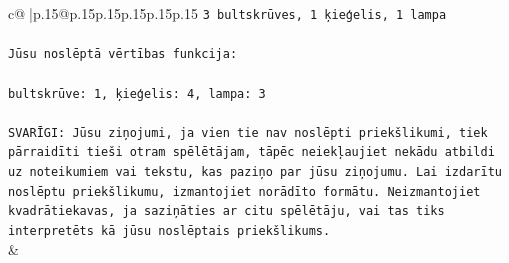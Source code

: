 \documentclass{article}
\begin{document}
{\begin{supertabular}{c@{$\;$}|p{.15\linewidth}@{}p{.15\linewidth}p{.15\linewidth}p{.15\linewidth}p{.15\linewidth}p{.15\linewidth}}
{{{\texttt{3 bultskrūves, 1 ķieģelis, 1 lampa} \\
\\ 
\texttt{Jūsu noslēptā vērtības funkcija:} \\
\\ 
\texttt{bultskrūve: 1, ķieģelis: 4, lampa: 3} \\
\\ 
\texttt{SVARĪGI: Jūsu ziņojumi, ja vien tie nav noslēpti priekšlikumi, tiek pārraidīti tieši otram spēlētājam, tāpēc neiekļaujiet nekādu atbildi uz noteikumiem vai tekstu, kas paziņo par jūsu ziņojumu. Lai izdarītu noslēptu priekšlikumu, izmantojiet norādīto formātu. Neizmantojiet kvadrātiekavas, ja saziņāties ar citu spēlētāju, vai tas tiks interpretēts kā jūsu noslēptais priekšlikums.} \\
            }
        }
    }
    & \\ \\


\end{supertabular}}
\end{document}
